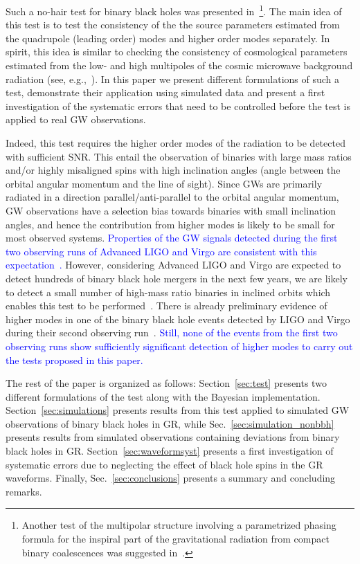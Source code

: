 \documentclass[prd,preprintnumbers,twocolumn,eqsecnum,floatfix,a4paper,nofootinbib,superscriptaddress]{revtex4}
\newcommand{\blue}[1]{\textcolor{blue}{#1}}
\begin{document}
Such a no-hair test for binary black holes was presented in~\cite{Dhanpal:2018ufk}\footnote{Another test of the multipolar structure involving a parametrized phasing formula for the inspiral part of the gravitational radiation from compact binary coalescences was suggested in~\cite{kastha2018testing,kastha2019testing}.}. The main idea of this test is to test the consistency of the the source parameters estimated from the quadrupole (leading order) modes and higher order modes separately. In spirit, this idea is similar to checking the consistency of cosmological parameters estimated from the low- and high multipoles of the cosmic microwave background radiation (see, e.g.,~\cite{Aghanim:2018eyx}). In this paper we present different formulations of such a test, demonstrate their application using simulated data and present a first investigation of the systematic errors that need to be controlled before the test is applied to real GW observations.

Indeed, this test requires the higher order modes of the radiation to be detected with sufficient SNR. This entail the observation of binaries with large mass ratios and/or highly misaligned spins with high inclination angles (angle between the orbital angular momentum and the line of sight). Since GWs are primarily radiated in a direction parallel/anti-parallel to the orbital angular momentum, GW observations have a selection bias towards binaries with small inclination angles, and hence the contribution from higher modes is likely to be small for most observed systems. 
\blue{Properties of the GW signals detected during the first two observing runs of Advanced LIGO and Virgo are consistent with this expectation~\cite{abbott2019gwtc}.}
However, considering Advanced LIGO and Virgo are expected to detect hundreds of binary black hole mergers in the next few years, we are likely to detect a small number of high-mass ratio binaries in inclined orbits which enables this test to be performed~\cite{Dhanpal:2018ufk}. There is already preliminary evidence of higher modes in one of the binary black hole events detected by LIGO and Virgo during their second observing run~\cite{Chatziioannou:2019dsz}. \blue{Still, none of the events from the first two observing runs show sufficiently significant detection of higher modes to carry out the tests proposed in this paper.}

The rest of the paper is organized as follows: Section~\ref{sec:test} presents two different formulations of the test along with the Bayesian implementation. Section~\ref{sec:simulations} presents results from this test applied to simulated GW observations of binary black holes in GR, while Sec.~\ref{sec:simulation_nonbbh} presents results from simulated observations containing deviations from binary black holes in GR. Section~\ref{sec:waveformsyst} presents a first investigation of systematic errors due to neglecting the effect of black hole spins in the GR waveforms. Finally, Sec.~\ref{sec:conclusions} presents a summary and concluding remarks. 
\end{document}
